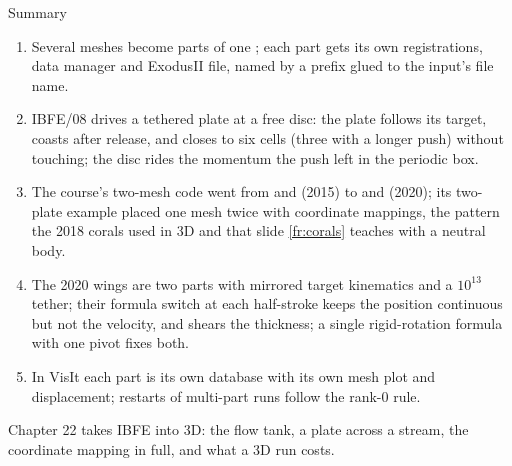 \documentclass[aspectratio=169,11pt]{beamer}
\begin{document}
\begin{frame}{Summary}
\label{fr:summary}
\footnotesize
\begin{enumerate}
  \item Several meshes become parts of one ; each part gets its own registrations, data manager and ExodusII file, named by a prefix glued to the input's file name.
  \item IBFE/08 drives a tethered plate at a free disc: the plate follows its target, coasts after release, and closes to six cells (three with a longer push) without touching; the disc rides the momentum the push left in the periodic box.
  \item The course's two-mesh code went from  and  (2015) to  and  (2020); its two-plate example placed one mesh twice with coordinate mappings, the pattern the 2018 corals used in 3D and that slide \ref{fr:corals} teaches with a neutral body.
  \item The 2020 wings are two parts with mirrored target kinematics and a $10^{13}$ tether; their formula switch at each half-stroke keeps the position continuous but not the velocity, and shears the thickness; a single rigid-rotation formula with one pivot fixes both.
  \item In VisIt each part is its own database with its own mesh plot and displacement; restarts of multi-part runs follow the rank-0 rule.
\end{enumerate}
\begin{homebox}
\footnotesize Chapter 22 takes IBFE into 3D: the flow tank, a plate across a stream, the coordinate mapping in full, and what a 3D run costs.
\end{homebox}
\end{frame}
\end{document}
